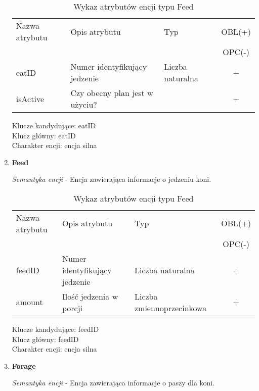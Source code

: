 \documentclass[12pt,twoside]{report}
\begin{document}
\begin{enumerate}[start=1,label={\bfseries ENC\textbackslash00\arabic*}]
	\begin{table}[h!]
		\centering
		\begin{tabular}{|l|l|l|c|}
			\hline
			Nazwa atrybutu & Opis atrybutu & Typ & OBL(+) \\
			& & &  OPC(-) \\
			\hline
			eatID & Numer identyfikujący jedzenie & Liczba naturalna & + \\
			\hline
			isActive &  Czy obecny plan jest w użyciu? &  & + \\
			\hline
		\end{tabular}
		\caption{Wykaz atrybutów encji typu Feed }
	\end{table}
	Klucze kandydujące: eatID \\
	Klucz główny: eatID \\
	Charakter encji: encja silna \\
	
	
	\item \textbf{Feed}
	
	\textit{Semantyka encji} - Encja zawierająca informacje o jedzeniu koni.
	
	\begin{table}[h!]
		\centering
		\begin{tabular}{|l|l|l|c|}
			\hline
			Nazwa atrybutu & Opis atrybutu & Typ & OBL(+) \\
			& & &  OPC(-) \\
			\hline
			feedID & Numer identyfikujący jedzenie & Liczba naturalna & + \\
			\hline
			amount &  Ilość jedzenia w porcji & Liczba zmiennoprzecinkowa & + \\
			\hline
		\end{tabular}
		\caption{Wykaz atrybutów encji typu Feed }
	\end{table}
	Klucze kandydujące: feedID \\
	Klucz główny: feedID \\
	Charakter encji: encja silna \\
	
	\item \textbf{Forage}
	
	\textit{Semantyka encji} - Encja zawierająca informacje o paszy dla koni.
	

\end{enumerate}
\end{document}
